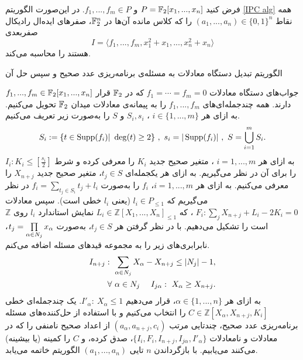 \begin{proposition}
فرض کنید 
$P = \mathbb{F}_{2}[x_{1},...,x_{n}]$ 
و 
$f_{1},...,f_{m}\in P$. 
در این‌صورت الگوریتم 
\ref{IPC alg}
همه‌  نقاط 
$(a_{1},...,a_{n})\in \{0,1 \}^{n}$
را که کلاس مانده‌  آن‌ها در 
$\mathbb{F}_{2}^{n}$، 
صفرهای ایده‌ال رادیکال صفربعدی 
\begin{equation*}
I = \langle f_{1},...,f_{m},x_{1}^{2} + x_{1},...,x_{n}^{2} + x_{n}\rangle
\end{equation*}
هستند را محاسبه می‌کند. 
\renewcommand{\algorithmicrequire}{\textbf{ورودی}}
\renewcommand{\algorithmicensure}{\textbf{خروجی}}
\begin{algorithm}[h]
	\caption{الگوریتم تبدیل دستگاه معادلات به مسئله‌ی برنامه‌ریزی عدد صحیح و سپس حل آن}
	\label{IPC alg}
	\begin{algorithmic}[1]				
		\REQUIRE $f_{1},...,f_{m}\in \mathbb{F}_{2}[x_{1},...,x_{n}]$
		\ENSURE جواب‌های دستگاه معادلات 
		$f_{1} = \cdots = f_{m} = 0$
		که در 
		$\mathbb{F}_{2}$
		قرار دارند. 
\STATE 		همه‌  چندجمله‌ای‌های 
$f_{1},...,f_{m}$
را به پیمانه‌ی معادلات میدان 
$\mathbb{F}_{2}$
تحویل می‌کنیم. به ازای هر 
{\small $i\in\{1,...,m\}$}
، $S_{i}, s_{i}$ 
و
$S$
را به‌صورت زیر تعریف می‌کنیم. 
\begin{equation*}
S_{i} := \{t\in \operatorname{\mathrm{Supp}}(f_{i})| \ \deg(t)\geq 2\} \ , \ s_{i} = |\operatorname{\mathrm{Supp}}(f_{i})| \ , \ S = \bigcup_{i = 1}^{m}S_{i}.
\end{equation*}
\STATE به ازای هر 
$i = 1,...,m$
، متغیر صحیح جدید 
$K_{i}$
را معرفی  کرده  و شرط 
$I_{i}: K_{i}\leq [\frac{s_{i}}{2}]$
را برای آن در نظر می‌گیریم. 
\STATE به ازای هر یکجمله‌ای 
$t_{j}\in S$،
 متغیر صحیح جدید 
 $X_{n + j}$
 را معرفی می‌کنیم. به ازای هر 
 $i = 1,...,m$، 
 $f_{i}$
 را به‌صورت 
 $f_{i} = \sum_{t_{j}\in S_{i}}t_{j} + l_{i}$
 در نظر  می‌گیریم  که 
 $l_{i}\in P_{\leq 1}$
 (یعنی 
 $l_{i}$
 خطی است). سپس معادلات 
 $F_{i}: \sum_{j}X_{n + j} + L_{i} - 2K_{i} = 0$
 ، که  
 $L_{i}\in \mathbb{Z}[X_{1},...,X_{n}]_{\leq 1}$
 نمایش استاندارد 
 $l_{i}$
روی 
$\mathbb{Z}$
 است را  تشکیل می‌دهیم. 
 \STATE با در نظر گرفتن  هر  
 $t_{j}\in S$، 
 به‌صورت 
 $t_{j} = \prod\limits_{{\footnotesize \alpha \in N_{j}}}x_{\alpha}$، 
 نابرابری‌های  زیر  را به مجموعه قیدهای مسئله اضافه می‌کنم.
 \begin{align*}
 I_{n+j}:  \ \sum_{\alpha\in N_{j}}X_{\alpha} - X_{n+j}\leq |N_{j}| - 1,\\
 \forall  \ \alpha \in N_{j} \quad \ I_{j\alpha}:  \ X_{\alpha}\geq X_{n + j}.
 \end{align*}
\STATE به ازای هر 
$\alpha\in \{1,...,n\}$، 
قرار می‌دهیم 
$I'_{\alpha}: \ X_{\alpha} \leq 1$.
\STATE یک چندجمله‌ای خطی 
$C\in \mathbb{Z}[X_{\alpha}, X_{n+j}, K_{i}]$
را انتخاب می‌کنیم و با استفاده از حل‌کننده‌های مسئله  برنامه‌ریزی عدد صحیح، چندتایی مرتب 
$(a_{\alpha}, a_{n+j}, c_{i})$
از اعداد صحیح نامنفی را که در معادلات و نامعادلات 
$\{I_{i}, F_{i}, I_{n+j}, I_{j\alpha}, I'_{\alpha}\}$، 
صدق کرده،  و 
$C$
را کمینه (یا بیشینه) می‌کنند می‌یابیم. 
\STATE با بازگرداندن  
$n$
تایی  
$(a_{1},...,a_{n})$
الگوریتم خاتمه می‌یابد.
	\end{algorithmic}
\end{algorithm}
\end{proposition}
